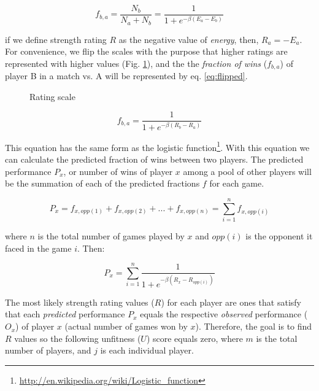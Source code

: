 \documentclass[12pt]{article}
\begin{document}
	\begin{equation}
	f_{b,a}  = \frac{ N_{b} }{ N_{a}+N_{b} }  =     \frac{1}{1 + e^{-\beta(E_{a}-E_{b})}}  
	\end{equation}

if we define strength rating $R$ as the negative value of \textit{energy}, then, $R_{a} = -E_{a}$.
For convenience, we flip the scales with the purpose that higher ratings are represented with higher values (Fig. \ref{fig:figlevels2}), and the the \textit{fraction of wins} ($f_{b,a}$) of player B in a match vs. A will be represented by eq. \ref{eq:flipped}.

	\begin{figure}[htb]
	\caption{\label{fig:figlevels2} Rating scale}
	\end{figure}


	\begin{equation} \label{eq:flipped}
	f_{b,a}  = \frac{1}{1 + e^{-\beta(R_{b}-R_{a})}}
	\end{equation}

This equation has the same form as the logistic function\footnote{\url{http://en.wikipedia.org/wiki/Logistic_function}}.
With this equation we can calculate the predicted fraction of wins between two players. 
The predicted performance $P_{x}$, or number of wins of player $x$ among a pool of other players will be the summation of each of the predicted fractions $f$ for each game.

	\begin{equation}
	P_{x} = f_{x,opp(1)} + f_{x,opp(2)} + ... + f_{x,opp(n)} = \sum\limits_{i=1}^n f_{x,opp(i)}
	\end{equation}

where $n$ is the total number of games played by $x$ and $opp(i)$ is the opponent it faced in the game $i$. Then:

	\begin{equation}
	P_{x} = \sum\limits_{i=1}^n \frac{1}{1 + e^{-\beta(R_{x}-R_{opp(i)})}}
	\end{equation}

The most likely strength rating values ($R$) for each player are ones that satisfy that each \textit{predicted} performance $P_{x}$ equals the respective \textit{observed} performance ($O_{x}$) of player $x$ (actual number of games won by $x$). 
Therefore, the goal is to find $R$ values so the following unfitness ($U$) score equals zero, where $m$ is the total number of players, and $j$ is each individual player.
\end{document}
